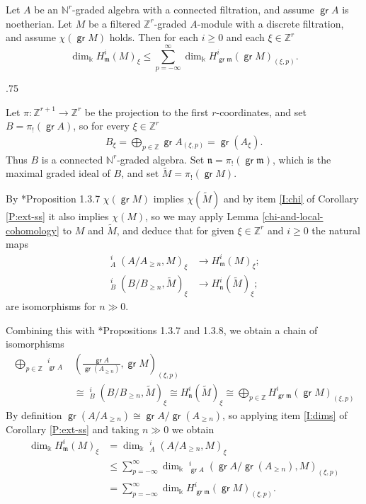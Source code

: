 \documentclass[11pt,fleqn]{article}
\makeatletter
\renewenvironment{proof}[1][\textit{Proof}]{\par
  \pushQED{\qed}%
  \normalfont \topsep.75\paraskip\relax
  \trivlist
  \item[\hskip\labelsep
        \itshape
    #1\@addpunct{.}]\ignorespaces
}{%
  \popQED\endtrivlist\@endpefalse
}
\newcommand\NN{\mathbb N}
\newcommand\ZZ{\mathbb Z}
\renewcommand\to{\longrightarrow}
\renewcommand\k{\Bbbk}
\newcommand\m{\mathfrak m}
\newcommand\n{\mathfrak n}
\DeclareMathOperator\GrExt{\underline{\mathsf{Ext}}}
\DeclareMathOperator\gr{\mathsf{gr}}
\makeatother
\begin{document}
\begin{Corollary*}
Let $A$ be an $\NN^r$-graded algebra with a connected filtration, and 
assume $\gr A$ is noetherian. Let $M$ be a filtered $\ZZ^r$-graded $A$-module 
with a discrete filtration, and assume $\chi(\gr M)$ holds. Then for each 
$i \geq 0$ and each $\xi \in \ZZ^r$ 
\[
  \dim_\k H^i_\m(M)_\xi 
    \leq \sum_{p=- \infty}^\infty \dim_\k H^i_{\gr \m}(\gr M)_{(\xi, p)}.
\]
\end{Corollary*}
\begin{proof}
Let $\pi: \ZZ^{r+1} \to \ZZ^r$ be the projection to the first $r$-coordinates, 
and set $B = \pi_!(\gr A)$, so for every $\xi \in \ZZ^r$
\begin{align*}
B_\xi = \bigoplus_{p \in \ZZ} \gr A_{(\xi, p)} = \gr (A_\xi).
\end{align*}
Thus $B$ is a connected $\NN^r$-graded algebra. Set $\n = \pi_!(\gr \m)$, 
which is the maximal graded ideal of $B$, and set $\tilde M = \pi_!(\gr M)$.

By \cite{RZ2}*{Proposition 1.3.7} $\chi(\gr M)$ implies
$\chi(\tilde M)$ and by item \ref{I:chi} of Corollary \ref{P:ext-ss} it 
also implies $\chi(M)$, so we may apply Lemma \ref{chi-and-local-cohomology} 
to $M$ and $\tilde M$, and deduce that for given $\xi \in \ZZ^r$ and $i \geq 0$
the natural maps 
\begin{align*}
  \GrExt^i_A(A/A_{\geq n}, M)_\xi &\to H^i_\m(M)_\xi;\\
  \GrExt^i_B(B/B_{\geq n}, \tilde M)_\xi &\to H^i_\n( \tilde M)_\xi;
\end{align*}
are isomorphisms for $n \gg 0$.

Combining this with \cite{RZ2}*{Propositions 1.3.7 and 1.3.8}, we obtain a 
chain of isomorphisms
\begin{align*}
\bigoplus_{p \in \ZZ} 
  \GrExt^i_{\gr A}&\left(\frac{\gr A}{\gr (A_{\geq n})}, 
    \gr M \right)_{(\xi, p)} \\
  &\cong 
    \GrExt^i_B \left(B/B_{\geq n}, \tilde M \right)_\xi 
  \cong 
    H^i_\n(\tilde M)_\xi 
  \cong 
    \bigoplus_{p \in \ZZ} H^i_{\gr \m}(\gr M)_{(\xi, p)} 
\end{align*}
By definition $\gr(A/A_{\geq n}) \cong \gr A / \gr (A_{\geq n})$, so applying 
item  \ref{I:dims} of Corollary \ref{P:ext-ss} and taking $n \gg 0$ we obtain
\begin{align*}
\dim_\k H^i_\m(M)_\xi 
  &= \dim_\k \GrExt^i_A(A/A_{\geq n}, M)_\xi \\
  &\leq \sum_{p = -\infty}^\infty \dim_\k
  \GrExt^i_{\gr A}(\gr A / \gr (A_{\geq n}), M)_{(\xi, p)} \\
  &= \sum_{p = -\infty}^\infty \dim_\k H^i_{\gr \m}(\gr M)_{(\xi, p)}.
\end{align*}
\end{proof}
\end{document}
